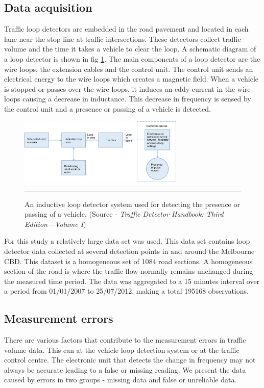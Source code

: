 \subsection{Data acquisition}
Traffic loop detectors are embedded in the road pavement and located in each lane near the stop
line at traffic intersections. These detectors collect traffic volume and the time it takes a
vehicle to clear the loop. A schematic diagram of a loop detector is shown in fig \ref{fig:loopDetector}.
The main components of a loop detector are the wire loops, the extension cables and the control unit.
The control unit sends an electrical energy to the wire loops which creates a magnetic field. When a
vehicle is stopped or passes over the wire loops, it induces an eddy current in the wire loops causing
a decrease in inductance. This decrease in frequency is sensed by the control unit and a presence or
passing of a vehicle is detected.

\begin{figure}[htbp]
  \centering
    \includegraphics[width=0.7\textwidth,height=0.7\textheight,keepaspectratio]{Figures/loop-detector.pdf}
    \rule{35em}{0.5pt}
  \caption[A vehicle loop detector system]{An inductive loop detector system used for detecting the
  presence or passing of a vehicle. (Source - \textit{Traffic Detector Handbook: Third Edition—Volume I})}
  \label{fig:loopDetector}
\end{figure}

For this study a relatively large data set was used. This data set contains loop detector data collected
at several detection points in and around the Melbourne CBD. This dataset is a homogeneous set of
1084 road sections. A homogeneous section of the road is where the traffic flow normally remains unchanged
during the measured time period. The data was aggregated to a 15 minutes interval over a period
from 01/01/2007 to 25/07/2012, making a total 195168 observations.

\subsection{Measurement errors}
There are various factors that contribute to the measurement errors in traffic volume data. This can
at the vehicle loop detection system or at the traffic control centre. The electronic unit that
detects the change in frequency may not always be accurate leading to a false or missing reading.
We present the data caused by errors in two groups - missing data and false or unreliable data.

